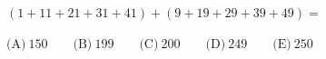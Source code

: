 $(1+11+21+31+41)+(9+19+29+39+49)=$



$\text{(A)}\ 150 \qquad \text{(B)}\ 199 \qquad \text{(C)}\ 200 \qquad \text{(D)}\ 249 \qquad \text{(E)}\ 250$
